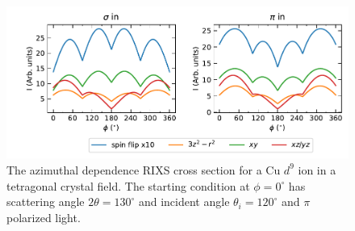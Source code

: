 \documentclass[aps,onecolumn, notitlepage, longbibliography]{revtex4-1}
\begin{document}
\begin{figure}
    \includegraphics{Figs/azimuthal.pdf}
    \caption{The azimuthal dependence RIXS cross section for a Cu $d^9$ ion in a tetragonal crystal field. The starting condition at $\phi=0^{\circ}$ has scattering angle $2\theta=130^{\circ}$ and incident angle $\theta_i=120^{\circ}$ and $\pi$ polarized light.  \label{azimuthal}}
\end{figure}
\end{document}

